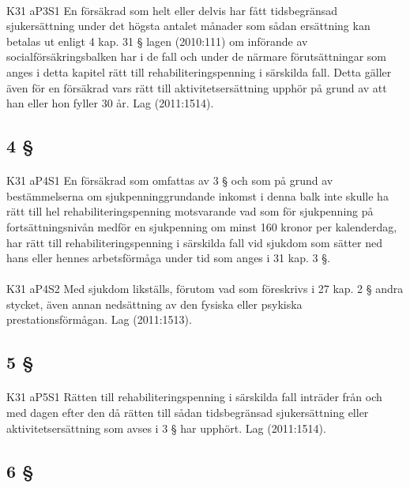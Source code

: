 \documentclass[a4paper,notitlepage,openany,10pt]{book}
\begin{document}
\paragraph*{}
{\tiny K31 aP3S1}
En försäkrad som helt eller delvis har fått tidsbegränsad sjukersättning under det högsta antalet månader som sådan ersättning kan betalas ut enligt 4 kap. 31 § lagen (2010:111) om införande av socialförsäkringsbalken har i de fall och under de närmare förutsättningar som anges i detta kapitel rätt till rehabiliteringspenning i särskilda fall. Detta gäller även för en försäkrad vars rätt till aktivitetsersättning upphör på grund av att han eller hon fyller 30 år.
Lag (2011:1514).
\subsection*{4 §}
\paragraph*{}
{\tiny K31 aP4S1}
En försäkrad som omfattas av 3 § och som på grund av bestämmelserna om sjukpenninggrundande inkomst i denna balk inte skulle ha rätt till hel rehabiliteringspenning motsvarande vad som för sjukpenning på fortsättningsnivån medför en sjukpenning om minst 160 kronor per kalenderdag, har rätt till rehabiliteringspenning i särskilda fall vid sjukdom som sätter ned hans eller hennes arbetsförmåga under tid som anges i 31 kap. 3 §.
\paragraph*{}
{\tiny K31 aP4S2}
Med sjukdom likställs, förutom vad som föreskrivs i 27 kap. 2 § andra stycket, även annan nedsättning av den fysiska eller psykiska prestationsförmågan.
Lag (2011:1513).
\subsection*{5 §}
\paragraph*{}
{\tiny K31 aP5S1}
Rätten till rehabiliteringspenning i särskilda fall inträder från och med dagen efter den då rätten till sådan tidsbegränsad sjukersättning eller aktivitetsersättning som avses i 3 § har upphört.
Lag (2011:1514).
\subsection*{6 §}
\end{document}
